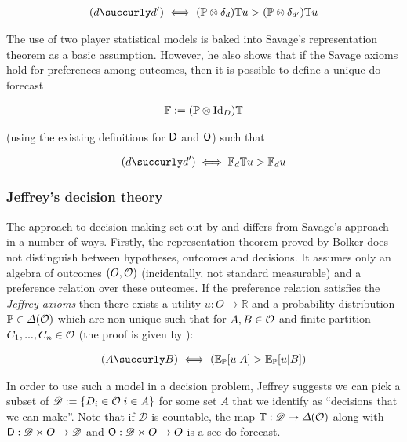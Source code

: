 \begin{align}
(d\succurly d')\iff (\prob{P}\otimes \delta_d)\kernel{T} u > (\prob{P}\otimes \delta_{d'})\kernel{T} u\label{eq:savage_utility}
\end{align}

The use of two player statistical models is baked into Savage's representation theorem as a basic assumption. However, he also shows that if the Savage axioms hold for preferences among outcomes, then it is possible to define a unique do-forecast

\begin{align}
    \mathbb{F}:=(\mathbb{P}\otimes \mathrm{Id}_D)\mathbb{T}
\end{align}

(using the existing definitions for $\mathsf{D}$ and $\mathsf{O}$) such that

\begin{align}
    (d\succurly d')\iff \kernel{F}_d\kernel{T} u > \kernel{F}_d u\label{eq:savage_utility}
\end{align}


\subsubsection{Jeffrey's decision theory}


The approach to decision making set out by \citet{jeffrey_logic_1990} and \citet{bolker_functions_1966} differs from Savage's approach in a number of ways. Firstly, the representation theorem proved by Bolker does not distinguish between hypotheses, outcomes and decisions. It assumes only an algebra of outcomes $(O,\mathcal{O})$ (incidentally, not standard measurable) and a preference relation over these outcomes. If the preference relation satisfies the \emph{Jeffrey axioms} then there exists a utility $u:O\to\mathbb{R}$ and a probability distribution $\mathbb{P}\in \Delta(\mathcal{O})$ which are non-unique such that for $A,B\in \mathcal{O}$ and finite partition $C_1,...,C_n\in \mathcal{O}$ (the proof is given by \citet{bolker_functions_1966}):

\begin{align}
    (A \succurly B) \iff (\mathbb{E}_{\prob{P}}[u|A]>\mathbb{E}_{\prob{P}}[u|B])
\end{align}

In order to use such a model in a decision problem, Jeffrey suggests we can pick a subset of $\mathscr{D}:=\{D_i\in \mathcal{O}|i\in A\}$ for some set $A$ that we identify as ``decisions that we can make''. Note that if $\mathscr{D}$ is countable, the map $\mathbb{T}:\mathscr{D}\to \Delta(\mathcal{O})$ along with $\mathsf{D}:\mathscr{D}\times O\to \mathscr{D}$ and $\mathsf{O}:\mathscr{D}\times O\to O$ is a see-do forecast.

